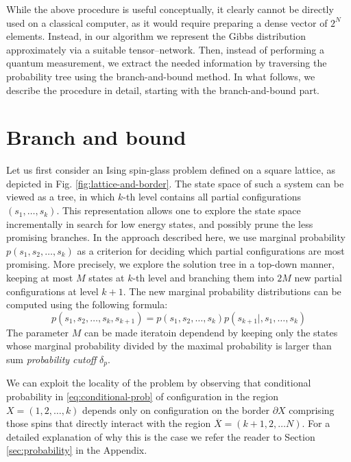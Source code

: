 While the above procedure is useful conceptually, it clearly cannot be directly
used on a classical computer, as it would require preparing a dense vector of
$2^{N}$ elements. Instead, in our algorithm we represent the Gibbs distribution
approximately via a suitable tensor--network. Then, instead of performing a
quantum measurement, we extract the needed information by traversing the
probability tree using the branch-and-bound method. In what follows, we
describe the procedure in detail, starting with the branch-and-bound
part.

\section{Branch and bound}
Let us first consider an Ising spin-glass problem defined on a square lattice,
as depicted in Fig. \ref{fig:lattice-and-border}. The state space of such a
system can be viewed as a tree, in which $k$-th level contains all partial
configurations $(s_1, \ldots, s_k)$. This representation allows one to explore
the state space incrementally in search for low energy states, and possibly
prune the less promising branches. In the approach described here, we use
marginal probability $p(s_1, s_2, \ldots, s_k)$ as a criterion for deciding
which partial configurations are most promising. More precisely, we explore the
solution tree in a top-down manner, keeping at most $M$ states at $k$-th level
and branching them into $2M$ new partial configurations at level $k+1$. The
new marginal probability distributions can be computed using the following formula:
\begin{equation}
  \label{eq:conditional-prob}
  p(s_1, s_2, \ldots, s_k, s_{k+1}) = p(s_1, s_2, \ldots, s_k)p(s_{k+1}|, s_1, \ldots, s_k)
\end{equation}
The parameter $M$ can be made iteratoin dependend by keeping only the states
whose marginal probability divided by the maximal probability is larger than
sum \emph{probability cutoff} $\delta_{p}$.

We can exploit the locality of the problem by observing that conditional
probability in \eqref{eq:conditional-prob} of configuration in the region $X =
  (1, 2, \ldots, k)$ depends only on configuration on the border $\partial X$ comprising those spins that directly interact with the region
  $\overline{X} = (k+1, 2, \ldots N)$. For a detailed explanation of why this is the case
  we refer the reader to Section \ref{sec:probability} in the Appendix.

